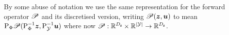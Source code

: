 By some abuse of notation we use the same representation for the forward operator \(\mathscr{P}\) and its discretised version, writing \(\mathscr{P}(\boldsymbol{z}, \boldsymbol{u})\) to mean \(\mathrm{P}_{\Phi}\mathscr{P}(\mathrm{P}_{\Phi}^{-1}\boldsymbol{z}, \mathrm{P}_{\mathcal{Y}}^{-1}\boldsymbol{u})\) where now \(\mathscr{P}:\mathbb{R}^{D_{\boldsymbol{\mathsf{z}}}}\times \mathbb{R}^{|\mathcal{Y}|} \to \mathbb{R}^{D_{\boldsymbol{\mathsf{z}}}}\).

